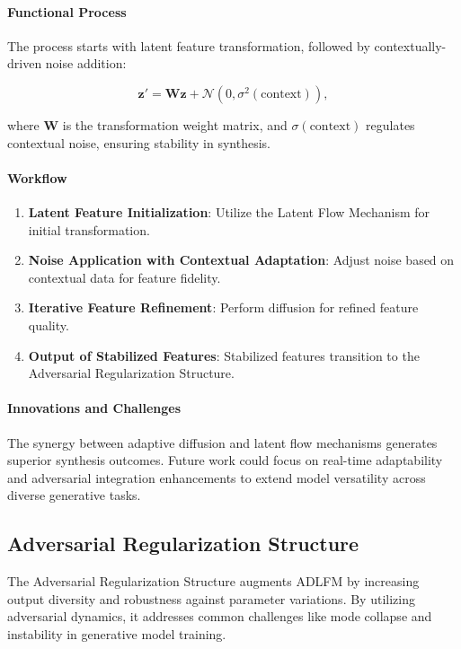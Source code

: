 \documentclass{article} %
\begin{document}
\paragraph{Functional Process}
The process starts with latent feature transformation, followed by contextually-driven noise addition:

\[
\mathbf{z}' = \mathbf{W} \mathbf{z} + \mathcal{N}(0, \sigma^2(\text{context})),
\]

where \( \mathbf{W} \) is the transformation weight matrix, and \( \sigma(\text{context}) \) regulates contextual noise, ensuring stability in synthesis.

\paragraph{Workflow}
\begin{enumerate}
    \item \textbf{Latent Feature Initialization}: Utilize the Latent Flow Mechanism for initial transformation.
    \item \textbf{Noise Application with Contextual Adaptation}: Adjust noise based on contextual data for feature fidelity.
    \item \textbf{Iterative Feature Refinement}: Perform diffusion for refined feature quality.
    \item \textbf{Output of Stabilized Features}: Stabilized features transition to the Adversarial Regularization Structure.
\end{enumerate}

\paragraph{Innovations and Challenges}
The synergy between adaptive diffusion and latent flow mechanisms generates superior synthesis outcomes. Future work could focus on real-time adaptability and adversarial integration enhancements to extend model versatility across diverse generative tasks.

\subsection{Adversarial Regularization Structure}

The Adversarial Regularization Structure augments ADLFM by increasing output diversity and robustness against parameter variations. By utilizing adversarial dynamics, it addresses common challenges like mode collapse and instability in generative model training.
\end{document}
